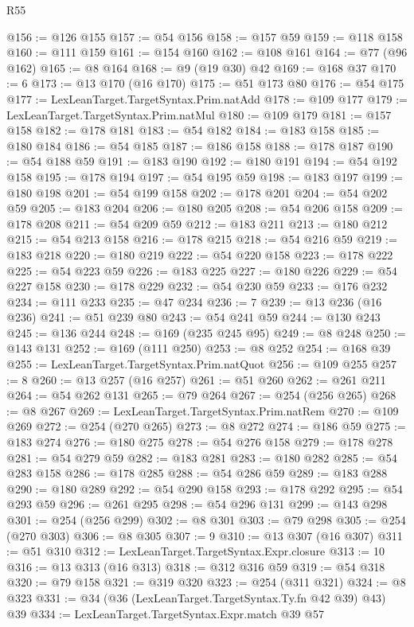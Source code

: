 \begin{lexlean}{R55}
\begin{coremodule}
@156 := @126 @155
@157 := @54 @156
@158 := @157 @59
@159 := @118 @158
@160 := @111 @159
@161 := @154 @160
@162 := @108 @161
@164 := @77 (@96 @162)
@165 := @8 @164
@168 := @9 (@19 @30) @42
@169 := @168 @37
@170 := 6
@173 := @13 @170 (@16 @170)
@175 := @51 @173 @80
@176 := @54 @175
@177 := LexLeanTarget.TargetSyntax.Prim.natAdd
@178 := @109 @177
@179 := LexLeanTarget.TargetSyntax.Prim.natMul
@180 := @109 @179
@181 := @157 @158
@182 := @178 @181
@183 := @54 @182
@184 := @183 @158
@185 := @180 @184
@186 := @54 @185
@187 := @186 @158
@188 := @178 @187
@190 := @54 @188 @59
@191 := @183 @190
@192 := @180 @191
@194 := @54 @192 @158
@195 := @178 @194
@197 := @54 @195 @59
@198 := @183 @197
@199 := @180 @198
@201 := @54 @199 @158
@202 := @178 @201
@204 := @54 @202 @59
@205 := @183 @204
@206 := @180 @205
@208 := @54 @206 @158
@209 := @178 @208
@211 := @54 @209 @59
@212 := @183 @211
@213 := @180 @212
@215 := @54 @213 @158
@216 := @178 @215
@218 := @54 @216 @59
@219 := @183 @218
@220 := @180 @219
@222 := @54 @220 @158
@223 := @178 @222
@225 := @54 @223 @59
@226 := @183 @225
@227 := @180 @226
@229 := @54 @227 @158
@230 := @178 @229
@232 := @54 @230 @59
@233 := @176 @232
@234 := @111 @233
@235 := @47 @234
@236 := 7
@239 := @13 @236 (@16 @236)
@241 := @51 @239 @80
@243 := @54 @241 @59
@244 := @130 @243
@245 := @136 @244
@248 := @169 (@235 @245 @95)
@249 := @8 @248
@250 := @143 @131
@252 := @169 (@111 @250)
@253 := @8 @252
@254 := @168 @39
@255 := LexLeanTarget.TargetSyntax.Prim.natQuot
@256 := @109 @255
@257 := 8
@260 := @13 @257 (@16 @257)
@261 := @51 @260
@262 := @261 @211
@264 := @54 @262 @131
@265 := @79 @264
@267 := @254 (@256 @265)
@268 := @8 @267
@269 := LexLeanTarget.TargetSyntax.Prim.natRem
@270 := @109 @269
@272 := @254 (@270 @265)
@273 := @8 @272
@274 := @186 @59
@275 := @183 @274
@276 := @180 @275
@278 := @54 @276 @158
@279 := @178 @278
@281 := @54 @279 @59
@282 := @183 @281
@283 := @180 @282
@285 := @54 @283 @158
@286 := @178 @285
@288 := @54 @286 @59
@289 := @183 @288
@290 := @180 @289
@292 := @54 @290 @158
@293 := @178 @292
@295 := @54 @293 @59
@296 := @261 @295
@298 := @54 @296 @131
@299 := @143 @298
@301 := @254 (@256 @299)
@302 := @8 @301
@303 := @79 @298
@305 := @254 (@270 @303)
@306 := @8 @305
@307 := 9
@310 := @13 @307 (@16 @307)
@311 := @51 @310
@312 := LexLeanTarget.TargetSyntax.Expr.closure
@313 := 10
@316 := @13 @313 (@16 @313)
@318 := @312 @316 @59
@319 := @54 @318
@320 := @79 @158
@321 := @319 @320
@323 := @254 (@311 @321)
@324 := @8 @323
@331 := @34 (@36 (LexLeanTarget.TargetSyntax.Ty.fn @42 @39) @43) @39
@334 := LexLeanTarget.TargetSyntax.Expr.match @39 @57

\end{coremodule}
\end{lexlean}
